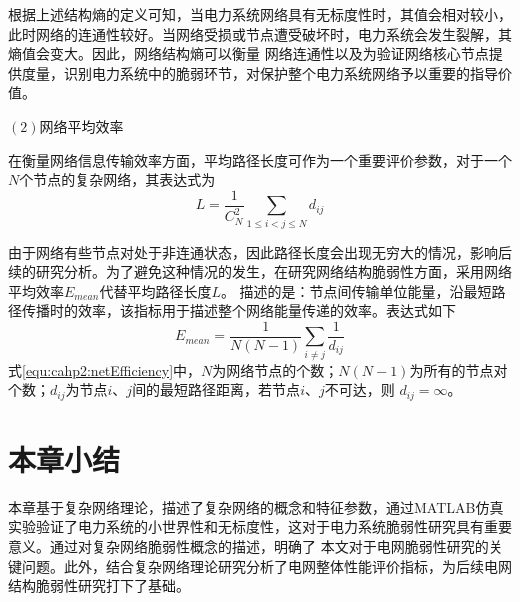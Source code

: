 根据上述结构熵的定义可知，当电力系统网络具有无标度性时，其值会相对较小，此时网络的连通性较好。当网络受损或节点遭受破坏时，电力系统会发生裂解，其熵值会变大。因此，网络结构熵可以衡量
网络连通性以及为验证网络核心节点提供度量，识别电力系统中的脆弱环节，对保护整个电力系统网络予以重要的指导价值。

$(2)$网络平均效率

在衡量网络信息传输效率方面，平均路径长度可作为一个重要评价参数，对于一个$N$个节点的复杂网络，其表达式为
\begin{equation}
  L=\frac{1}{C_{N}^{2}} \sum_{1 \leq i<j \leq N} d_{i j}
\end{equation}

由于网络有些节点对处于非连通状态，因此路径长度会出现无穷大的情况，影响后续的研究分析。为了避免这种情况的发生，在研究网络结构脆弱性方面，采用网络平均效率$E_{mean}$代替平均路径长度$L$。
描述的是：节点间传输单位能量，沿最短路径传播时的效率，该指标用于描述整个网络能量传递的效率。表达式如下
\begin{equation}
\label{equ:cahp2:netEfficiency}
  E_{mean}=\frac{1}{N(N-1)} \sum_{i \neq j} \frac{1}{d_{i j}}
\end{equation}
式\ref{equ:cahp2:netEfficiency}中，$N$为网络节点的个数；$N(N-1)$为所有的节点对个数；$d_{ij}$为节点$i$、$j$间的最短路径距离，若节点$i$、$j$不可达，则 $d_{i j}=\infty$。

\section{本章小结}
\label{sec:sum2}
本章基于复杂网络理论，描述了复杂网络的概念和特征参数，通过MATLAB仿真实验验证了电力系统的小世界性和无标度性，这对于电力系统脆弱性研究具有重要意义。通过对复杂网络脆弱性概念的描述，明确了
本文对于电网脆弱性研究的关键问题。此外，结合复杂网络理论研究分析了电网整体性能评价指标，为后续电网结构脆弱性研究打下了基础。




